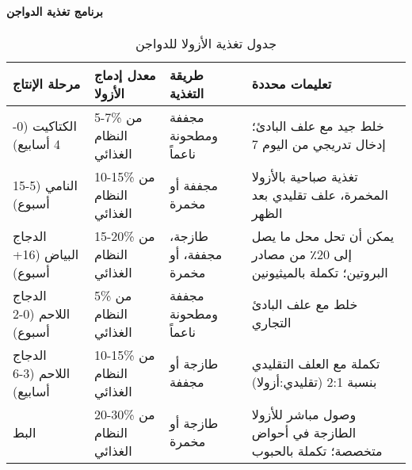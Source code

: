 \paragraph{برنامج تغذية الدواجن}
\begin{table}[h]
\centering
\caption{جدول تغذية الأزولا للدواجن}
\label{tab:poultry_feeding}
\begin{tabular}{|p{2.5cm}|p{2.5cm}|p{2.5cm}|p{4.5cm}|}
\hline
\textbf{مرحلة الإنتاج} & \textbf{معدل إدماج الأزولا} & \textbf{طريقة التغذية} & \textbf{تعليمات محددة} \\
\hline
الكتاكيت (0-4 أسابيع) & 5-7\% من النظام الغذائي & مجففة ومطحونة ناعماً & خلط جيد مع علف البادئ؛ إدخال تدريجي من اليوم 7 \\
\hline
النامي (5-15 أسبوع) & 10-15\% من النظام الغذائي & مجففة أو مخمرة & تغذية صباحية بالأزولا المخمرة، علف تقليدي بعد الظهر \\
\hline
الدجاج البياض (16+ أسبوع) & 15-20\% من النظام الغذائي & طازجة، مجففة، أو مخمرة & يمكن أن تحل محل ما يصل إلى 20٪ من مصادر البروتين؛ تكملة بالميثيونين \\
\hline
الدجاج اللاحم (0-2 أسبوع) & 5\% من النظام الغذائي & مجففة ومطحونة ناعماً & خلط مع علف البادئ التجاري \\
\hline
الدجاج اللاحم (3-6 أسابيع) & 10-15\% من النظام الغذائي & طازجة أو مجففة & تكملة مع العلف التقليدي بنسبة 2:1 (تقليدي:أزولا) \\
\hline
البط & 20-30\% من النظام الغذائي & طازجة أو مخمرة & وصول مباشر للأزولا الطازجة في أحواض متخصصة؛ تكملة بالحبوب \\
\hline
\end{tabular}
\end{table}


